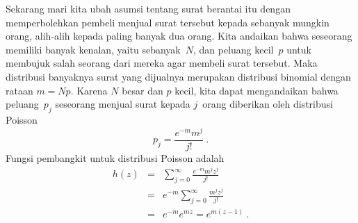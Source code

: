 \begin{example}
Sekarang mari kita ubah asumsi tentang surat berantai itu dengan memperbolehkan pembeli menjual
surat tersebut kepada sebanyak mungkin orang, alih-alih kepada paling banyak dua orang.  Kita
andaikan bahwa seseorang memiliki banyak kenalan, yaitu sebanyak~$N$, dan
peluang kecil~$p$ untuk membujuk salah seorang dari mereka agar membeli surat tersebut.  Maka
distribusi banyaknya surat yang dijualnya merupakan distribusi binomial
dengan rataan $m = Np$.  Karena $N$ besar dan $p$ kecil, kita dapat
mengandaikan bahwa peluang~$p_j$ seseorang menjual surat kepada
$j$~orang diberikan oleh distribusi Poisson
$$
p_j = \frac{e^{-m} m^j}{j!}\ .
$$
\newpage
\noindent
Fungsi pembangkit untuk distribusi Poisson adalah
\begin{eqnarray*}
h(z) &=& \sum_{j = 0}^\infty \frac{e^{-m} m^j z^j}{j!} \\
     &=& e^{-m} \sum_{j = 0}^\infty \frac{m^j z^j}{j!} \\
     &=& e^{-m} e^{mz} = e^{m(z - 1)}\ .
\end{eqnarray*}


\end{example}
